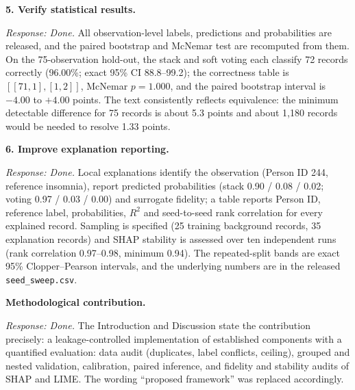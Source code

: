 \documentclass[11pt,a4paper]{article}
\newcommand{\rc}[2]{\par\medskip\noindent\textbf{#1}\par\noindent\textit{Response: Done.} #2\par}
\begin{document}
\rc{5. Verify statistical results.}{All observation-level labels, predictions and probabilities are released, and the paired bootstrap and McNemar test are recomputed from them. On the 75-observation hold-out, the stack and soft voting each classify 72 records correctly (96.00\%; exact 95\% CI 88.8--99.2); the correctness table is $[[71,1],[1,2]]$, McNemar $p=1.000$, and the paired bootstrap interval is $-4.00$ to $+4.00$ points. The text consistently reflects equivalence: the minimum detectable difference for 75 records is about 5.3 points and about 1{,}180 records would be needed to resolve 1.33 points.}
\rc{6. Improve explanation reporting.}{Local explanations identify the observation (Person ID 244, reference insomnia), report predicted probabilities (stack 0.90 / 0.08 / 0.02; voting 0.97 / 0.03 / 0.00) and surrogate fidelity; a table reports Person ID, reference label, probabilities, $R^2$ and seed-to-seed rank correlation for every explained record. Sampling is specified (25 training background records, 35 explanation records) and SHAP stability is assessed over ten independent runs (rank correlation 0.97--0.98, minimum 0.94). The repeated-split bands are exact 95\% Clopper--Pearson intervals, and the underlying numbers are in the released \texttt{seed\_sweep.csv}.}
\rc{Methodological contribution.}{The Introduction and Discussion state the contribution precisely: a leakage-controlled implementation of established components with a quantified evaluation: data audit (duplicates, label conflicts, ceiling), grouped and nested validation, calibration, paired inference, and fidelity and stability audits of SHAP and LIME. The wording ``proposed framework'' was replaced accordingly.}
\end{document}

